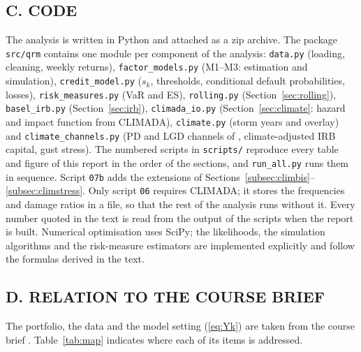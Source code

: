 \subsection*{C. CODE}
\sloppy The analysis is written in Python and attached as a zip archive. The package \texttt{src/qrm} contains one module per component of the analysis: \texttt{data.py} (loading, cleaning, weekly returns), \texttt{factor\_models.py} (M1--M3: estimation and simulation), \texttt{credit\_model.py} ($s_k$, thresholds, conditional default probabilities, losses), \texttt{risk\_measures.py} (VaR and ES), \texttt{rolling.py} (Section~\ref{sec:rolling}), \texttt{basel\_irb.py} (Section~\ref{sec:irb}), \texttt{climada\_io.py} (Section~\ref{sec:climate}: hazard and impact function from CLIMADA), \texttt{climate.py} (storm years and overlay) and \texttt{climate\_channels.py} (PD and LGD channels of \citealp{Pozdyshev25}, climate-adjusted IRB capital, gust stress). The numbered scripts in \texttt{scripts/} reproduce every table and figure of this report in the order of the sections, and \texttt{run\_all.py} runs them in sequence. Script \texttt{07b} adds the extensions of Sections~\ref{subsec:climbis}--\ref{subsec:climstress}. Only script \texttt{06} requires CLIMADA; it stores the frequencies and damage ratios in a file, so that the rest of the analysis runs without it. Every number quoted in the text is read from the output of the scripts when the report is built. Numerical optimisation uses SciPy; the likelihoods, the simulation algorithms and the risk-measure estimators are implemented explicitly and follow the formulas derived in the text.

\subsection*{D. RELATION TO THE COURSE BRIEF}
The portfolio, the data and the model setting (\ref{eq:Yk}) are taken from the course brief \citep{DeGiorgiFilkova26}. Table~\ref{tab:map} indicates where each of its items is addressed.

